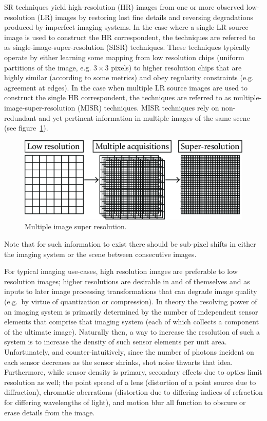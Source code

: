 SR techniques yield high-resolution (HR) images from one or more observed low-resolution (LR) images by restoring lost fine details and reversing degradations produced by imperfect imaging systems.
%
In the case where a single LR source image is used to construct the HR correspondent, the techniques are referred to as single-image-super-resolution (SISR) techniques.
%
These techniques typically operate by either learning some mapping from low resolution chips (uniform partitions of the image, e.g. \(3\times 3\) pixels) to higher resolution chips that are highly similar (according to some metrics) and obey regularity constraints (e.g. agreement at edges).
%
In the case when multiple LR source images are used to construct the single HR correspondent, the techniques are referred to as multiple-image-super-resolution (MISR) techniques.
%
MISR techniques rely on non-redundant and yet pertinent information in multiple images of the same scene (see figure~\ref{fig:misr}).
\begin{figure}
	\includegraphics[width=\linewidth,keepaspectratio]{figures/classical/misr.png}
	\caption{Multiple image super resolution\cite{misr}.}
	\label{fig:misr}
\end{figure}
%
Note that for such information to exist there should be sub-pixel shifts in either the imaging system or the scene between consecutive images.


For typical imaging use-cases, high resolution images are preferable to low resolution images; higher resolutions are
desirable in and of themselves and as inputs to later image processing transformations that can degrade image quality (e.g.\ by virtue of quantization or compression).
%
In theory the resolving power of an imaging system is primarily determined by the number of independent sensor elements that comprise that imaging system (each of which collects a component of the ultimate image).
%
Naturally then, a way to increase the resolution of such a system is to increase the density of such sensor elements per unit area.
%
Unfortunately, and counter-intuitively, since the number of photons incident on each sensor decreases as the sensor shrinks, shot noise thwarts that idea.
%
Furthermore, while sensor density is primary, secondary effects due to optics limit resolution as well;
the point spread of a lens (distortion of a point source due to diffraction), chromatic aberrations (distortion due to differing indices of refraction for differing wavelengths of light), and motion blur all function to obscure or erase details from the image.

